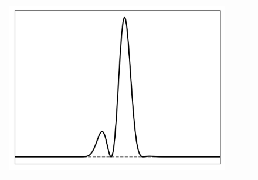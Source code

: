 \documentclass[10pt,final,xcolor=dvipsnames]{beamer}
\begin{document}
\begin{frame}
\begin{figure}
{\begin{tabular}{cccc}
	    \includegraphics[scale=0.2]{localpsf_revised_figures/frog_1d_a=1.0.png} & 

\end{tabular}}
\end{figure}
\end{frame}
\end{document}
